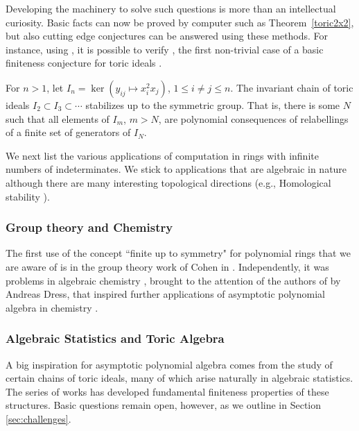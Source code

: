 Developing the machinery to solve such questions is more than an intellectual curiosity.  Basic facts can now be proved by computer such as Theorem~\ref{toric2x2}, but also cutting edge conjectures can be answered using these methods.  For instance, using \cite{EquivariantGB}, it is possible to verify \cite{draisma2013noetherianity, Krone:egb-toric}, the first non-trivial case of a basic finiteness conjecture for toric ideals \cite{aschenbrenner2007finite}.  

\begin{theorem}\label{monomthm}
For $n > 1$, let $I_n = \ker (y_{ij} \mapsto x_i^2 x_j)$, $1 \leq i \neq j \leq n$.  The invariant chain of toric ideals $I_2 \subset I_3 \subset \cdots$ stabilizes up to the symmetric group.  That is, there is some $N$ such that all elements of $I_m$, $m > N$, are polynomial consequences of relabellings of a finite set of generators of $I_N$.
\end{theorem}


We next list the various applications of computation in rings with infinite numbers of indeterminates.  
We stick to applications that are algebraic in nature although there are many interesting topological directions (e.g., Homological stability \cite{randal2013homological, church2012homological}).

\subsubsection{Group theory and Chemistry}

The first use of the concept ``finite up to symmetry" for polynomial rings that we are aware of is in the group theory work of Cohen in \cite{cohen1967laws}.  
Independently, it was problems in algebraic chemistry \cite{ruch1967vandermondesche}, brought to the attention of the authors of \cite{aschenbrenner2007finite} by Andreas Dress, that inspired further applications of asymptotic polynomial algebra in chemistry \cite{Draisma08b}.

\subsubsection{Algebraic Statistics and Toric Algebra}

A big inspiration for asymptotic polynomial algebra comes from the study of certain chains of toric ideals, many of which arise naturally in algebraic statistics.  The series of works \cite{Hillar13, hillar2016corrigendum, draisma2013noetherianity, KKL:equivariant-markov, Krone:egb-toric} has developed fundamental finiteness properties of these structures.  Basic questions remain open, however, as we outline in Section \ref{sec:challenges}.  

